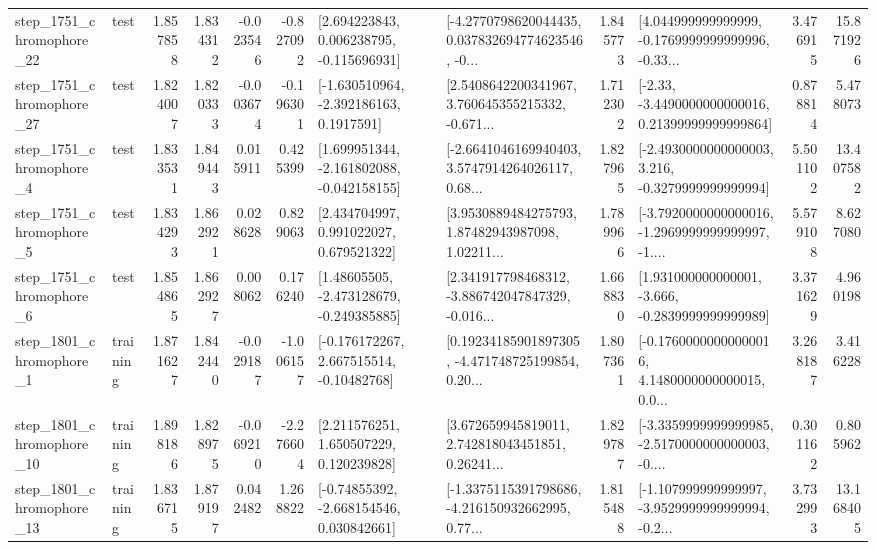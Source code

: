 \begin{tabular}{llrrrrllrlrr}
 step\_1751\_chromophore\_22 &      test &      1.857858 &    1.834312 &     -0.023546 & -0.827092 &    [2.694223843, 0.006238795, -0.115696931] &  [-4.2770798620044435, 0.037832694774623546, -0... &       1.845773 &  [4.044999999999999, -0.1769999999999996, -0.33... &            3.476915 &         15.871926 \\
 step\_1751\_chromophore\_27 &      test &      1.824007 &    1.820333 &     -0.003674 & -0.196301 &     [-1.630510964, -2.392186163, 0.1917591] &  [2.5408642200341967, 3.760645355215332, -0.671... &       1.712302 &  [-2.33, -3.4490000000000016, 0.21399999999999864] &            0.878814 &          5.478073 \\
  step\_1751\_chromophore\_4 &      test &      1.833531 &    1.849443 &      0.015911 &  0.425399 &   [1.699951344, -2.161802088, -0.042158155] &  [-2.6641046169940403, 3.5747914264026117, 0.68... &       1.827965 &  [-2.4930000000000003, 3.216, -0.3279999999999994] &            5.501102 &         13.407582 \\
  step\_1751\_chromophore\_5 &      test &      1.834293 &    1.862921 &      0.028628 &  0.829063 &     [2.434704997, 0.991022027, 0.679521322] &  [3.9530889484275793, 1.87482943987098, 1.02211... &       1.789966 &  [-3.7920000000000016, -1.2969999999999997, -1.... &            5.579108 &          8.627080 \\
  step\_1751\_chromophore\_6 &      test &      1.854865 &    1.862927 &      0.008062 &  0.176240 &    [1.48605505, -2.473128679, -0.249385885] &  [2.341917798468312, -3.886742047847329, -0.016... &       1.668830 &   [1.931000000000001, -3.666, -0.2839999999999989] &            3.371629 &          4.960198 \\
  step\_1801\_chromophore\_1 &  training &      1.871627 &    1.842440 &     -0.029187 & -1.006157 &    [-0.176172267, 2.667515514, -0.10482768] &  [0.19234185901897305, -4.471748725199854, 0.20... &       1.807361 &  [-0.17600000000000016, 4.1480000000000015, 0.0... &            3.268187 &          3.416228 \\
 step\_1801\_chromophore\_10 &  training &      1.898186 &    1.828975 &     -0.069210 & -2.276604 &     [2.211576251, 1.650507229, 0.120239828] &  [3.672659945819011, 2.742818043451851, 0.26241... &       1.829787 &  [-3.3359999999999985, -2.5170000000000003, -0.... &            0.301162 &          0.805962 \\
 step\_1801\_chromophore\_13 &  training &      1.836715 &    1.879197 &      0.042482 &  1.268822 &    [-0.74855392, -2.668154546, 0.030842661] &  [-1.3375115391798686, -4.216150932662995, 0.77... &       1.815488 &  [-1.107999999999997, -3.9529999999999994, -0.2... &            3.732993 &         13.168405 \\

\end{tabular}
